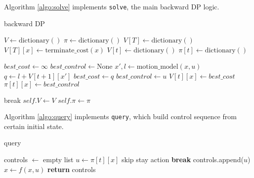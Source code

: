 \documentclass[conference]{IEEEtran}
\begin{document}
Algorithm \ref{algo:solve} implements \texttt{solve}, the main backward DP logic.
\begin{algorithm}
\caption{backward DP}
\label{algo:solve}
\begin{algorithmic}[1] %
    \State $V \gets \text{dictionary}()$
    \State $\pi \gets \text{dictionary}()$
    \State {}
    \State $V[T] \gets \text{dictionary}()$
        \State $V[T][x] \gets \text{terminate\_cost}(x)$
    \EndFor
    \State {}
        \State $V[t] \gets \text{dictionary}()$
        \State $\pi[t] \gets \text{dictionary}()$

            \State $best\_cost \gets \infty$
            \State $best\_control \gets \text{None}$
                \State $x', l \gets \text{motion\_model}(x, u)$
                    \State $q \gets l + V[t+1][x']$
                        \State $best\_cost \gets q$
                        \State $best\_control \gets u$
                    \EndIf
                \EndIf
            \EndFor
                \State $V[t][x] \gets best\_cost$
                \State $\pi[t][x] \gets best\_control$
            \EndIf

        \EndFor
            \State break \label{line:t}
        \EndIf
    \EndFor
    \State $\textit{self}.V \gets V$
    \State $\textit{self}.\pi \gets \pi$
\EndProcedure
\end{algorithmic}
\end{algorithm}


Algorithm \ref{algo:query} implements \texttt{query}, 
which build control sequence from certain initial state.
\begin{algorithm}
\caption{query}
\label{algo:query}
\begin{algorithmic}[1] %
    \State controls $\gets$ empty list
        \State $ u \gets \pi[t][x]$
        \Comment skip stay action
            \State \textbf{break}
        \EndIf
        \State controls.append($u$)
        \State $x \gets f(x, u)$
    \EndFor
    \State \textbf{return} controls
\EndProcedure
\end{algorithmic}
\end{algorithm}
\end{document}
